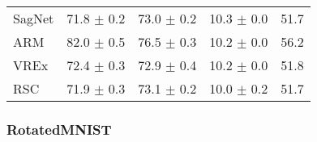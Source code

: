 \documentclass{article}
\begin{document}
\begin{center}
{\begin{tabular}{lcccc}
SagNet               & 71.8 $\pm$ 0.2       & 73.0 $\pm$ 0.2       & 10.3 $\pm$ 0.0       & 51.7                 \\
ARM                  & 82.0 $\pm$ 0.5       & 76.5 $\pm$ 0.3       & 10.2 $\pm$ 0.0       & 56.2                 \\
VREx                 & 72.4 $\pm$ 0.3       & 72.9 $\pm$ 0.4       & 10.2 $\pm$ 0.0       & 51.8                 \\
RSC                  & 71.9 $\pm$ 0.3       & 73.1 $\pm$ 0.2       & 10.0 $\pm$ 0.2       & 51.7                 \\
\bottomrule
\end{tabular}}
\end{center}

\subsubsection{RotatedMNIST}
\end{document}

